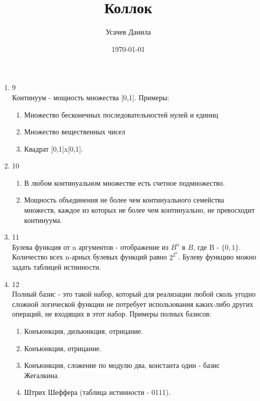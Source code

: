 \documentclass[12pt,a4paper]{scrartcl}
\title{Коллок}
\author{Усачев Данила}
\date{\today}
\begin{document}
\maketitle
\noindent

\begin{enumerate}
\item 9 \\
Континуум - мощность множества [0,1]. Примеры:
\begin{enumerate}
\item Множество бесконечных последовательностей нулей и единиц
\item Множество вещественных чисел
\item Квадрат [0,1]x[0,1].
\end{enumerate}


\item 10
\begin {enumerate}
\item В любом континуальном множестве есть счетное подмножество.
\item Мощность объединения не более чем континуального семейства множеств,
каждое из которых не более чем континуально, не превосходит континуума.
\end{enumerate}

\item 11\\
Булева функция от n аргументов - отображение из $B^{n}$ в $B$, где B - $\{0,1\}$.
Количество всех n-арных булевых функций равно $2^{2^{n}}$. Булеву функцию
можно задать таблицей истинности.\\
\item 12\\
Полный базис - это такой набор, который для реализации любой сколь
угодно сложной логической функции не потребует использования каких-либо других
операций, не входящих в этот набор.
Примеры полных базисов:
\begin {enumerate}
\item Конъюнкция, дизъюнкция, отрицание.
\item Конъюнкция, отрицание.
\item Конъюнкция, сложение по модулю два, константа один - базис Жегалкина.
\item Штрих Шеффера (таблица истинности - 0111).
\end {enumerate}

\end{enumerate}
\end{document}
